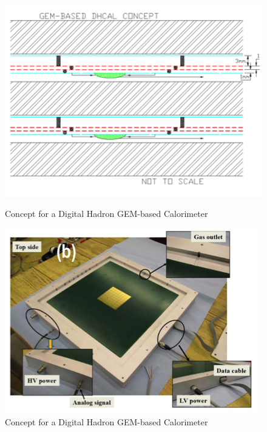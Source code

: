 \begin{figure}
	\centering
	\begin{minipage}{.495\textwidth}
		\centering
	\includegraphics[width=\textwidth]{Calorimeter/GEM_HCAL/crossSection}
	\caption{Concept for a Digital Hadron GEM-based Calorimeter}
	\label{fig:Calorimeter:GEM:crossSection}
	\end{minipage}\hfill
	\begin{minipage}{.495\textwidth}
		\centering
	\includegraphics[width=\textwidth]{Calorimeter/GEM_HCAL/prototype}
	\caption{Concept for a Digital Hadron GEM-based Calorimeter}
	\label{fig:Calorimeter:GEM:prototype}
	\end{minipage}
\end{figure}
